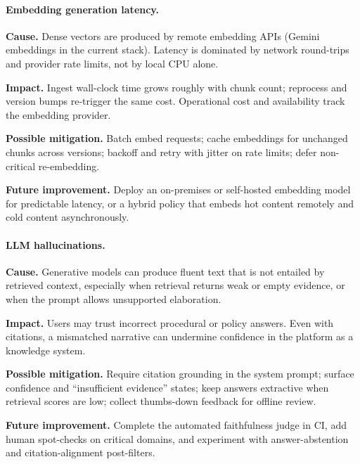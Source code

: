 \paragraph{Embedding generation latency.}
\noindent\textbf{Cause.} Dense vectors are produced by remote embedding APIs
(Gemini embeddings in the current stack). Latency is dominated by network
round-trips and provider rate limits, not by local CPU alone.\par\vspace{0.15em}
\noindent\textbf{Impact.} Ingest wall-clock time grows roughly with chunk count;
reprocess and version bumps re-trigger the same cost. Operational cost and
availability track the embedding provider.\par\vspace{0.15em}
\noindent\textbf{Possible mitigation.} Batch embed requests; cache embeddings for
unchanged chunks across versions; backoff and retry with jitter on rate limits;
defer non-critical re-embedding.\par\vspace{0.15em}
\noindent\textbf{Future improvement.} Deploy an on-premises or self-hosted
embedding model for predictable latency, or a hybrid policy that embeds hot
content remotely and cold content asynchronously.
\par\vspace{0.35em}
\paragraph{LLM hallucinations.}
\noindent\textbf{Cause.} Generative models can produce fluent text that is not
entailed by retrieved context, especially when retrieval returns weak or empty
evidence, or when the prompt allows unsupported elaboration.\par\vspace{0.15em}
\noindent\textbf{Impact.} Users may trust incorrect procedural or policy answers.
Even with citations, a mismatched narrative can undermine confidence in the
platform as a knowledge system.\par\vspace{0.15em}
\noindent\textbf{Possible mitigation.} Require citation grounding in the system
prompt; surface confidence and ``insufficient evidence'' states; keep answers
extractive when retrieval scores are low; collect thumbs-down feedback for
offline review.\par\vspace{0.15em}
\noindent\textbf{Future improvement.} Complete the automated faithfulness judge
in CI, add human spot-checks on critical domains, and experiment with
answer-abstention and citation-alignment post-filters.
\par\vspace{0.35em}
